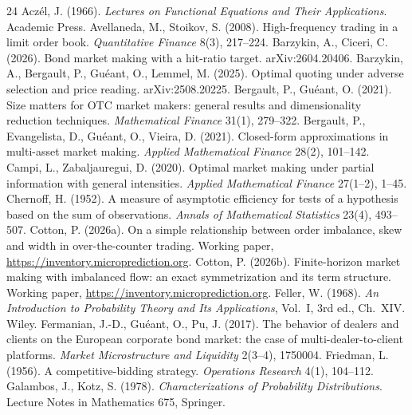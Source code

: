 \documentclass[11pt]{article}
\begin{document}
\begin{thebibliography}{24}
 Acz\'el, J. (1966). \emph{Lectures on Functional Equations and Their Applications}. Academic Press.
 Avellaneda, M., Stoikov, S. (2008). High-frequency trading in a limit order book. \emph{Quantitative Finance} 8(3), 217--224.
 Barzykin, A., Ciceri, C. (2026). Bond market making with a hit-ratio target. arXiv:2604.20406.
 Barzykin, A., Bergault, P., Gu\'eant, O., Lemmel, M. (2025). Optimal quoting under adverse selection and price reading. arXiv:2508.20225.
 Bergault, P., Gu\'eant, O. (2021). Size matters for OTC market makers: general results and dimensionality reduction techniques. \emph{Mathematical Finance} 31(1), 279--322.
 Bergault, P., Evangelista, D., Gu\'eant, O., Vieira, D. (2021). Closed-form approximations in multi-asset market making. \emph{Applied Mathematical Finance} 28(2), 101--142.
 Campi, L., Zabaljauregui, D. (2020). Optimal market making under partial information with general intensities. \emph{Applied Mathematical Finance} 27(1--2), 1--45.
 Chernoff, H. (1952). A measure of asymptotic efficiency for tests of a hypothesis based on the sum of observations. \emph{Annals of Mathematical Statistics} 23(4), 493--507.
 Cotton, P. (2026a). On a simple relationship between order imbalance, skew and width in over-the-counter trading. Working paper, \url{https://inventory.microprediction.org}.
 Cotton, P. (2026b). Finite-horizon market making with imbalanced flow: an exact symmetrization and its term structure. Working paper, \url{https://inventory.microprediction.org}.
 Feller, W. (1968). \emph{An Introduction to Probability Theory and Its Applications}, Vol.~I, 3rd ed., Ch.~XIV. Wiley.
 Fermanian, J.-D., Gu\'eant, O., Pu, J. (2017). The behavior of dealers and clients on the European corporate bond market: the case of multi-dealer-to-client platforms. \emph{Market Microstructure and Liquidity} 2(3--4), 1750004.
 Friedman, L. (1956). A competitive-bidding strategy. \emph{Operations Research} 4(1), 104--112.
 Galambos, J., Kotz, S. (1978). \emph{Characterizations of Probability Distributions}. Lecture Notes in Mathematics 675, Springer.

\end{thebibliography}
\end{document}
